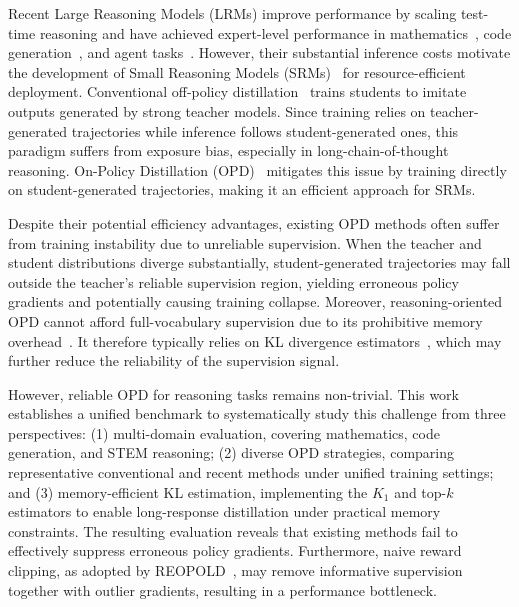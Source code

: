 \documentclass{article} %
\renewcommand{\cite}[1]{\citep{#1}}
\begin{document}
Recent Large Reasoning Models (LRMs) \cite{zhang2025100,chen2024huatuogpto1medicalcomplexreasoning} improve performance by scaling test-time reasoning and have achieved expert-level performance in mathematics~\cite{ren2025deepseek}, code generation~\cite{anthropic2025claude}, and agent tasks~\cite{ghareeb_robin_2025}.
However, their substantial inference costs motivate the development of Small Reasoning Models (SRMs)~\cite{zhao2025mobilellm} for resource-efficient deployment.
Conventional off-policy distillation~\cite{kim2016sequence} trains students to imitate outputs generated by strong teacher models.
Since training relies on teacher-generated trajectories while inference follows student-generated ones, this paradigm suffers from exposure bias, especially in long-chain-of-thought reasoning.
On-Policy Distillation (OPD)~\cite{lu2025onpolicy,agarwal2024onpolicy} mitigates this issue by training directly on student-generated trajectories, making it an efficient approach for SRMs.

Despite their potential efficiency advantages, existing OPD methods often suffer from training instability due to unreliable supervision. 
When the teacher and student distributions diverge substantially, student-generated trajectories may fall outside the teacher's reliable supervision region, yielding erroneous policy gradients and potentially causing training collapse.
Moreover, reasoning-oriented OPD cannot afford full-vocabulary supervision due to its prohibitive memory overhead~\cite{agarwal2024onpolicy}. 
It therefore typically relies on KL divergence estimators~\cite{lu2025onpolicy}, which may further reduce the reliability of the supervision signal.


However, reliable OPD for reasoning tasks remains non-trivial. 
This work establishes a unified benchmark to systematically study this challenge from three perspectives: 
(1) multi-domain evaluation, covering mathematics, code generation, and STEM reasoning; 
(2) diverse OPD strategies, comparing representative conventional and recent methods under unified training settings; and 
(3) memory-efficient KL estimation, implementing the $K_1$ and top-$k$ estimators to enable long-response distillation under practical memory constraints. 
The resulting evaluation reveals that existing methods fail to effectively suppress erroneous policy gradients. 
Furthermore, naive reward clipping, as adopted by REOPOLD~\cite{ko2026scaling}, may remove informative supervision together with outlier gradients, resulting in a performance bottleneck.
\end{document}
